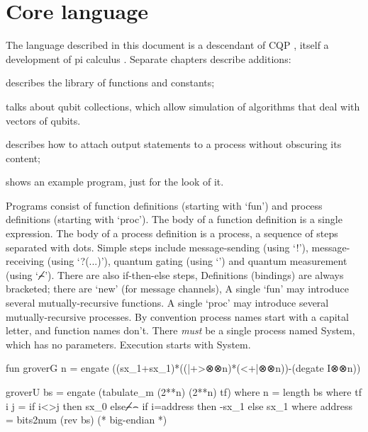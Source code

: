 
\chapter{Core language}

The language described in this document is a descendant of CQP \citep{GaySJ:comqp}, itself a development of pi calculus \citep{DBLP:journals/iandc/MilnerPW92a}. Separate chapters describe additions:  

\begin{itemize*}
\item{} describes the library of functions and constants;
\item{} talks about qubit collections, which allow simulation of algorithms that deal with vectors of qubits.
\item{} describes how to attach output statements to a process without obscuring its content;  
\end{itemize*}

 shows an example program, just for the look of it. 

Programs consist of function definitions (starting with `fun') and process definitions (starting with `proc'). The body of a function definition is a single expression. The body of a process definition is a process, a sequence of steps separated with dots. Simple steps include message-sending (using `!'), message-receiving (using `?(...)'), quantum gating (using `\verbtt{>>}') and quantum measurement (using `⌢̸'). There are also if-then-else steps, Definitions (bindings) are always bracketed; there are `new' (for message channels), A single `fun' may introduce several mutually-recursive functions. A single `proc' may introduce several mutually-recursive processes. By convention process names start with a capital letter, and function names don't. There \emph{must} be a single process named System, which has no parameters. Execution starts with System.

\mvb{\corenotationexample}
fun groverG n = engate ((sx_1+sx_1)*((|+>⊗⊗n)*(<+|⊗⊗n))-(degate I⊗⊗n))

   groverU bs = engate (tabulate_m (2**n) (2**n) tf)
                 where n = length bs
                 where tf i j = if i<>j      then  sx_0 else⌢̸⌢
                                if i=address then -sx_1 else 
                                                   sx_1
                 where address = bits2num (rev bs) (* big-endian *)  
                 
